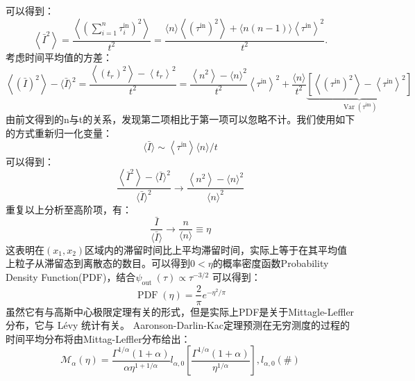 可以得到：
\begin{equation}
\left\langle\bar{I}^{2}\right\rangle =\frac{\left\langle\left(\sum_{i=1}^{n} \tau_{i}^{\mathrm{in}}\right)^{2}\right\rangle}{t^{2}}
=\frac{\langle n\rangle\left\langle\left(\tau^{\mathrm{in}}\right)^{2}\right\rangle+\langle n(n-1)\rangle\left\langle\tau^{\mathrm{in}}\right\rangle^{2}}{t^{2}} .
\end{equation}
考虑时间平均值的方差：
\begin{equation}
\left\langle(\bar{I})^{2}\right\rangle-\langle\bar{I}\rangle^{2}=\frac{\left\langle\left(t_{r}\right)^{2}\right\rangle-\left\langle t_{r}\right\rangle^{2}}{t^{2}}=\frac{\left\langle n^{2}\right\rangle-\langle n\rangle^{2}}{t^{2}}\left\langle\tau^{\mathrm{in}}\right\rangle^{2}+\frac{\langle n\rangle}{t^{2}} \underbrace{\left[\left\langle\left(\tau^{\mathrm{in}}\right)^{2}\right\rangle-\left\langle\tau^{\mathrm{in}}\right\rangle^{2}\right]}_{\operatorname{Var}\left(\tau^{\mathrm{im}}\right)}
\end{equation}
由前文得到的n与t的关系，发现第二项相比于第一项可以忽略不计。我们使用如下的方式重新归一化变量：
\begin{equation}
\langle\bar{I}\rangle \sim\left\langle\tau^{\mathrm{in}}\right\rangle\langle n\rangle / t
\end{equation}
可以得到：
\begin{equation}
\frac{\left\langle\bar{I}^{2}\right\rangle-\langle\bar{I}\rangle^{2}}{\langle\bar{I}\rangle^{2}} \rightarrow \frac{\left\langle n^{2}\right\rangle-\langle n\rangle^{2}}{\langle n\rangle^{2}}
\end{equation}
重复以上分析至高阶项，有：
\begin{equation}
\frac{\bar{I}}{\langle\bar{I}\rangle} \rightarrow \frac{n}{\langle n\rangle} \equiv \eta
\end{equation}
这表明在$\left(x_{1}, x_{2}\right)$区域内的滞留时间比上平均滞留时间，实际上等于在其平均值上粒子从滞留态到离散态的数目。可以得到$0<\eta $的概率密度函数Probability Density Function(PDF)\cite{godrecheStatisticsOccupationTime2001}，结合$\psi_{\text {out }}(\tau) \propto \tau^{-3 / 2}$
可以得到：\begin{equation}
\operatorname{PDF}(\eta)=\frac{2}{\pi} e^{-\eta^{2} / \pi}
\end{equation}
虽然它有与高斯中心极限定理有关的形式，但是实际上PDF是关于Mittagle-Leffler分布，它与  L$\textrm{\'{e}}$vy  统计有关。
Aaronson-Darlin-Kac定理预测在无穷测度的过程的时间平均分布将由Mittag-Leffler分布给出：
\begin{equation}
\mathscr{M}_{\alpha}(\eta)=\frac{\Gamma^{1 / \alpha}(1+\alpha)}{\alpha \eta^{1+1 / \alpha}} l_{\alpha, 0}\left[\frac{\Gamma^{1 / \alpha}(1+\alpha)}{\eta^{1 / \alpha}}\right], l_{\alpha, 0}(\#)
\end{equation}

